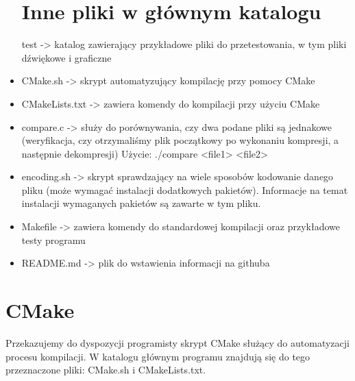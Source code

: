 \documentclass[]{article}
\begin{document}
\begin{itemize}
\section{Inne pliki w głównym katalogu}\label{header-n231}
test -> katalog zawierający przykładowe pliki do przetestowania, w tym pliki dźwiękowe i graficzne
\item
CMake.sh -> skrypt automatyzujący kompilację przy pomocy CMake
\item
CMakeLists.txt -> zawiera komendy do kompilacji przy użyciu CMake
\item
compare.c -> służy do porównywania, czy dwa podane pliki są jednakowe (weryfikacja, czy otrzymaliśmy plik początkowy po wykonaniu kompresji, a następnie dekompresji) Użycie: ./compare <file1> <file2>
\item
encoding.sh -> skrypt sprawdzający na wiele sposobów kodowanie danego pliku (może wymagać instalacji dodatkowych pakietów). Informacje na temat instalacji wymaganych pakietów są zawarte w tym pliku.
\item
Makefile -> zawiera komendy do standardowej kompilacji oraz przykładowe testy programu
\item
README.md -> plik do wstawienia informacji na githuba

\end{itemize}

\section{CMake}\label{header-n231}
Przekazujemy do dyspozycji programisty skrypt CMake służący do automatyzacji procesu kompilacji. W katalogu głównym programu znajdują się do tego przeznaczone pliki: CMake.sh i CMakeLists.txt.
\end{document}
